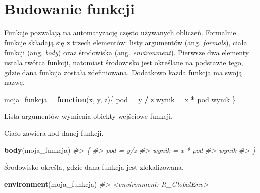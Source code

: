 \documentclass[paper=6in:9in,pagesize=pdftex,headinclude=on,footinclude=on,10pt]{scrbook}
\newenvironment{Shaded}{\begin{snugshade}}{\end{snugshade}}
\newcommand{\CommentTok}[1]{\textcolor[rgb]{0.56,0.35,0.01}{\textit{#1}}}
\newcommand{\ControlFlowTok}[1]{\textcolor[rgb]{0.13,0.29,0.53}{\textbf{#1}}}
\newcommand{\KeywordTok}[1]{\textcolor[rgb]{0.13,0.29,0.53}{\textbf{#1}}}
\newcommand{\NormalTok}[1]{#1}
\newcommand{\OperatorTok}[1]{\textcolor[rgb]{0.81,0.36,0.00}{\textbf{#1}}}
\newcommand{\StringTok}[1]{\textcolor[rgb]{0.31,0.60,0.02}{#1}}
\begin{document}
\hypertarget{budowanie-funkcji}{%
\section{Budowanie funkcji}\label{budowanie-funkcji}}

Funkcje pozwalają na automatyzację często używanych obliczeń.
Formalnie funkcje składają się z trzech elementów: listy argumentów (ang. \emph{formals}), ciała funkcji (ang. \emph{body}) oraz środowiska (ang. \emph{environment}).
Pierwsze dwa elementy ustala twórca funkcji, natomiast środowisko jest określane na podstawie tego, gdzie dana funkcja została zdefiniowana.
Dodatkowo każda funkcja ma swoją nazwę.

\begin{Shaded}
\begin{Highlighting}[]
\NormalTok{moja_funkcja =}\StringTok{ }\ControlFlowTok{function}\NormalTok{(x, y, z)\{}
\NormalTok{  pod =}\StringTok{ }\NormalTok{y }\OperatorTok{/}\StringTok{ }\NormalTok{z}
\NormalTok{  wynik =}\StringTok{ }\NormalTok{x }\OperatorTok{*}\StringTok{ }\NormalTok{pod}
\NormalTok{  wynik}
\NormalTok{\}}
\end{Highlighting}
\end{Shaded}

Lista argumentów wymienia obiekty wejściowe funkcji.

\begin{Shaded}
\end{Shaded}

Ciało zawiera kod danej funkcji.

\begin{Shaded}
\begin{Highlighting}[]
\KeywordTok{body}\NormalTok{(moja_funkcja)}
\CommentTok{#> \{}
\CommentTok{#>     pod = y/z}
\CommentTok{#>     wynik = x * pod}
\CommentTok{#>     wynik}
\CommentTok{#> \}}
\end{Highlighting}
\end{Shaded}

Środowisko określa, gdzie dana funkcja jest zlokalizowana.

\begin{Shaded}
\begin{Highlighting}[]
\KeywordTok{environment}\NormalTok{(moja_funkcja)}
\CommentTok{#> <environment: R_GlobalEnv>}
\end{Highlighting}
\end{Shaded}
\end{document}
